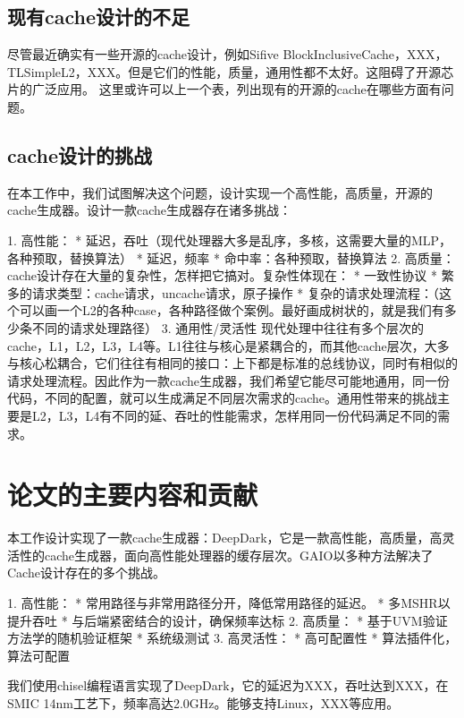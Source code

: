 \subsection{现有cache设计的不足}


尽管最近确实有一些开源的cache设计，例如Sifive BlockInclusiveCache，XXX，TLSimpleL2，XXX。但是它们的性能，质量，通用性都不太好。这阻碍了开源芯片的广泛应用。
这里或许可以上一个表，列出现有的开源的cache在哪些方面有问题。

\subsection{cache设计的挑战}

在本工作中，我们试图解决这个问题，设计实现一个高性能，高质量，开源的cache生成器。设计一款cache生成器存在诸多挑战：

1. 高性能：
  * 延迟，吞吐（现代处理器大多是乱序，多核，这需要大量的MLP，各种预取，替换算法）
  * 延迟，频率
  * 命中率：各种预取，替换算法
2. 高质量：
  cache设计存在大量的复杂性，怎样把它搞对。复杂性体现在：
  * 一致性协议
  * 繁多的请求类型：cache请求，uncache请求，原子操作
  * 复杂的请求处理流程：（这个可以画一个L2的各种case，各种路径做个案例。最好画成树状的，就是我们有多少条不同的请求处理路径）
3. 通用性/灵活性
  现代处理中往往有多个层次的cache，L1，L2，L3，L4等。L1往往与核心是紧耦合的，而其他cache层次，大多与核心松耦合，它们往往有相同的接口：上下都是标准的总线协议，同时有相似的请求处理流程。因此作为一款cache生成器，我们希望它能尽可能地通用，同一份代码，不同的配置，就可以生成满足不同层次需求的cache。通用性带来的挑战主要是L2，L3，L4有不同的延、吞吐的性能需求，怎样用同一份代码满足不同的需求。

\section{论文的主要内容和贡献}

本工作设计实现了一款cache生成器：DeepDark，它是一款高性能，高质量，高灵活性的cache生成器，面向高性能处理器的缓存层次。GAIO以多种方法解决了Cache设计存在的多个挑战。

1. 高性能：
  * 常用路径与非常用路径分开，降低常用路径的延迟。
  * 多MSHR以提升吞吐
  * 与后端紧密结合的设计，确保频率达标
2. 高质量：
  * 基于UVM验证方法学的随机验证框架
  * 系统级测试
3. 高灵活性：
  * 高可配置性
  * 算法插件化，算法可配置

  我们使用chisel编程语言实现了DeepDark，它的延迟为XXX，吞吐达到XXX，在SMIC 14nm工艺下，频率高达2.0GHz。能够支持Linux，XXX等应用。

